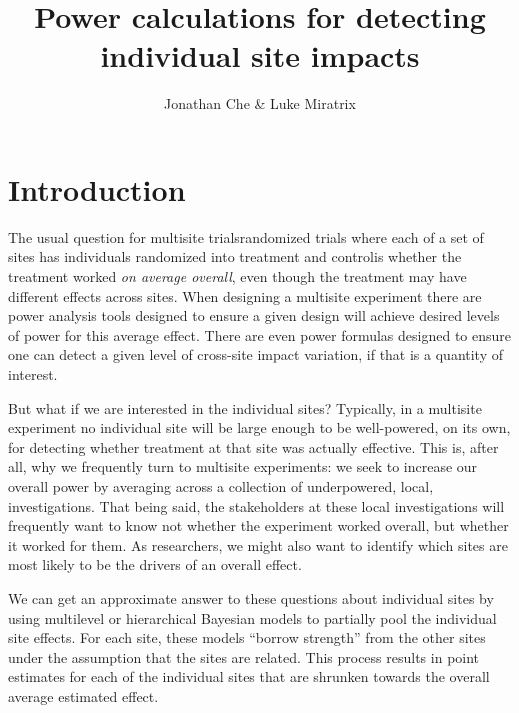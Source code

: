 \documentclass[]{article}
\title{Power calculations for detecting \\ individual site impacts}
\author{Jonathan Che \& Luke Miratrix}
\begin{document}
\maketitle



\section{Introduction}

The usual question for multisite trials\textemdash randomized trials where each of a set of sites has individuals randomized into treatment and control\textemdash is whether the treatment worked \emph{on average overall}, even though the treatment may have different effects across sites.
When designing a multisite experiment there are power analysis tools designed to ensure a given design will achieve desired levels of power for this average effect.
There are even power formulas designed to ensure one can detect a given level of cross-site impact variation, if that is a quantity of interest.

But what if we are interested in the individual sites?
Typically, in a multisite experiment no individual site will be large enough to be well-powered, on its own, for detecting whether treatment at that site was actually effective.
This is, after all, why we frequently turn to multisite experiments: we seek to increase our overall power by averaging across a collection of underpowered, local, investigations.
That being said, the stakeholders at these local investigations will frequently want to know not whether the experiment worked overall, but whether it worked for them.
As researchers, we might also want to identify which sites are most likely to be the drivers of an overall effect.

We can get an approximate answer to these questions about individual sites by using multilevel or hierarchical Bayesian models to partially pool the individual site effects.
For each site, these models ``borrow strength'' from the other sites under the assumption that the sites are related.
This process results in point estimates for each of the individual sites that are shrunken towards the overall average estimated effect.
\end{document}
